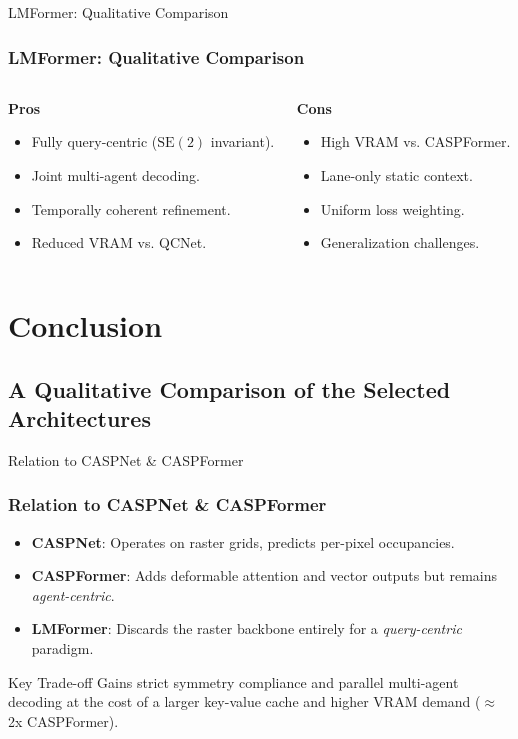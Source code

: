 \documentclass[10pt,aspectratio=169]{beamer}
\newcommand{\greenoplus}{\textcolor{mygreen}{\ding{51}}}
\newcommand{\redominus}{\textcolor{myred}{\ding{55}}}
\begin{document}
\begin{frame}{LMFormer: Qualitative Comparison}
    \frametitle{LMFormer: Qualitative Comparison}
    \begin{columns}[T]
        \begin{column}{0.5\textwidth}
            \textbf{Pros} \greenoplus
            \begin{itemize}
                \item Fully query-centric (\(\mathrm{SE}(2)\) invariant).
                \item Joint multi-agent decoding.
                \item Temporally coherent refinement.
                \item Reduced VRAM vs. QCNet.
            \end{itemize}
        \end{column}
        \begin{column}{0.5\textwidth}
            \textbf{Cons} \redominus
            \begin{itemize}
                \item High VRAM vs. CASPFormer.
                \item Lane-only static context.
                \item Uniform loss weighting.
                \item Generalization challenges.
            \end{itemize}
        \end{column}
    \end{columns}
\end{frame}

\section{Conclusion}

\subsection{A Qualitative Comparison of the Selected Architectures}

\begin{frame}{Relation to CASPNet \& CASPFormer}
    \frametitle{Relation to CASPNet \& CASPFormer}
    \begin{itemize}
        \item \textbf{CASPNet}: Operates on raster grids, predicts per-pixel occupancies.
        \item \textbf{CASPFormer}: Adds deformable attention and vector outputs but remains \emph{agent-centric}.
        \item \textbf{LMFormer}: Discards the raster backbone entirely for a \emph{query-centric} paradigm.
    \end{itemize}
    \vfill
    \begin{alertblock}{Key Trade-off}
    Gains strict symmetry compliance and parallel multi-agent decoding at the cost of a larger key-value cache and higher VRAM demand (\(\approx\)2x CASPFormer).
    \end{alertblock}
\end{frame}
\end{document}
